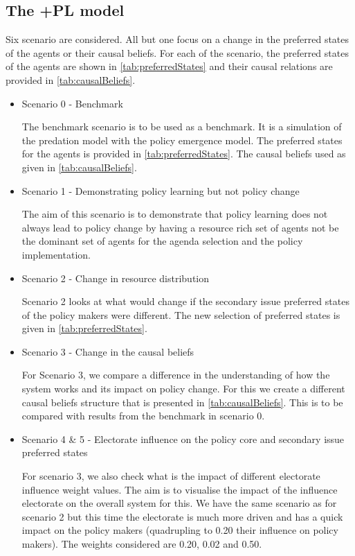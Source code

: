 \documentclass[12pt]{article}
\begin{document}
\subsection{The +PL model}

Six scenario are considered. All but one focus on a change in the preferred states of the agents or their causal beliefs. For each of the scenario, the preferred states of the agents are shown in \autoref{tab:preferredStates} and their causal relations are provided in \autoref{tab:causalBeliefs}.


\begin{itemize}
\item Scenario 0 - Benchmark

The benchmark scenario is to be used as a benchmark. It is a simulation of the predation model with the policy emergence model. The preferred states for the agents is provided in \autoref{tab:preferredStates}. The causal beliefs used as given in \autoref{tab:causalBeliefs}.

\item Scenario 1 - Demonstrating policy learning but not policy change

The aim of this scenario is to demonstrate that policy learning does not always lead to policy change by having a resource rich set of agents not be the dominant set of agents for the agenda selection and the policy implementation.


\item Scenario 2 - Change in resource distribution

Scenario 2 looks at what would change if the secondary issue preferred states of the policy makers were different. The new selection of preferred states is given in \autoref{tab:preferredStates}.

\item Scenario 3 - Change in the causal beliefs

For Scenario 3, we compare a difference in the understanding of how the system works and its impact on policy change. For this we create a different causal beliefs structure that is presented in \autoref{tab:causalBeliefs}. This is to be compared with results from the benchmark in scenario 0.

\item Scenario 4 \& 5 - Electorate influence on the policy core and secondary issue preferred states

For scenario 3, we also check what is the impact of different electorate influence weight values. The aim is to visualise the impact of the influence electorate on the overall system for this. We have the same scenario as for scenario 2 but this time the electorate is much more driven and has a quick impact on the policy makers (quadrupling to 0.20 their influence on policy makers). The weights considered are 0.20, 0.02 and 0.50.

\end{itemize}
\end{document}

